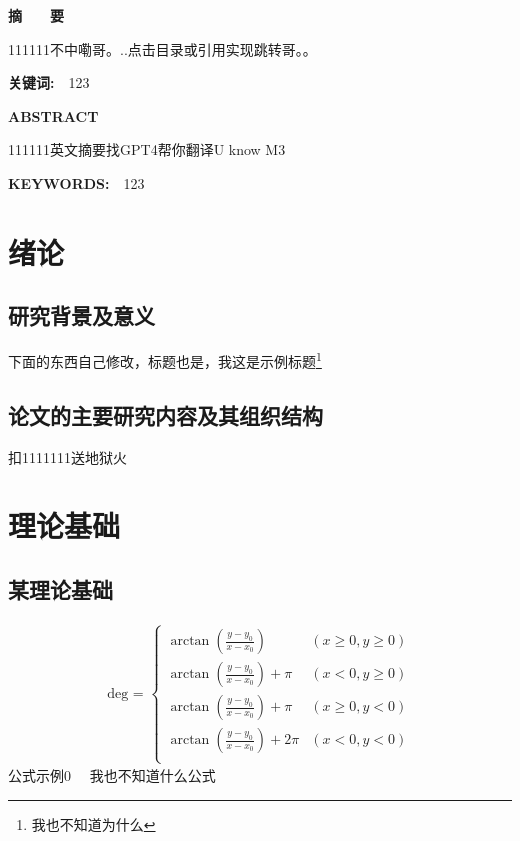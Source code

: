 \documentclass[UTF8,a4paper,12pt]{ctexart}
\begin{document}
	\begin{spacing}{1.4}
	\tableofcontents
	
	\end{spacing}
	\thispagestyle{fancy}
	\fancyfoot{}
	\newpage
	\fancyfoot[C]{\thepage} 
	 
	\centerline{\textbf{\fontsize{16pt}{\baselineskip}\heiti 摘　　要}}
	\vspace{0.4cm}
	111111不中嘞哥。..点击目录或引用实现跳转哥。。

	\vspace{0.2cm}
	\par \textbf{\fontsize{14pt}{\baselineskip}\heiti 关键词:　}123
	\setcounter{page}{1}
	\newpage
	\centerline{\textbf{\fontsize{16pt}{\baselineskip}ABSTRACT}}
	\vspace{0.4cm}
	111111英文摘要找GPT4帮你翻译U know M3
	\vspace{0.4cm}
	\par \textbf{\fontsize{14pt}{\baselineskip}KEYWORDS:　}123
	\newpage
	\setcounter{page}{1}
	\section{绪论}
	\subsection{研究背景及意义}
	下面的东西自己修改，标题也是，我这是示例标题\footnote{我也不知道为什么}
	
	\subsection{论文的主要研究内容及其组织结构}
	扣1111111送地狱火
	
	\section{理论基础}
	
	\subsection{某理论基础}
	\begin{equation}
		\begin{array}{c}
			\text {deg  = }\left\{\begin{array}{lc}
				\arctan (\frac{y-y_{0}}{x-x_{0}}) & (x\ge 0,y\ge 0) \\
				\arctan (\frac{y-y_{0}}{x-x_{0}})+\pi & (x<  0,y\ge 0) \\
				\arctan (\frac{y-y_{0}}{x-x_{0}})+\pi & (x\ge 0,y<  0) \\
				\arctan (\frac{y-y_{0}}{x-x_{0}})+2\pi & (x<  0,y<  0) \\
			\end{array}\right.
		\end{array}
	\end{equation}
	公式示例0  \ \  我也不知道什么公式
\end{document}
